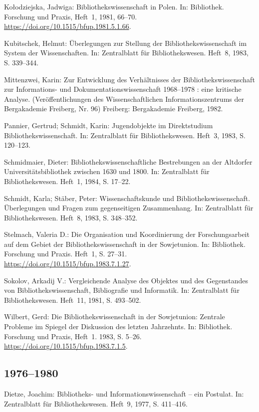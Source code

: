 \documentclass[a4paper,
fontsize=11pt,
oneside,
numbers=noperiodatend,
parskip=half-,
bibliography=totoc,
final
]{scrartcl}
\begin{document}
Kołodziejska, Jadwiga: Bibliothekswissenschaft in Polen. In: Bibliothek.
Forschung und Praxis, Heft~1, 1981, 66--70.
\url{https://doi.org/10.1515/bfup.1981.5.1.66}.

Kubitschek, Helmut: Überlegungen zur Stellung der
Bibliothekswissenschaft im System der Wissenschaften. In: Zentralblatt
für Bibliothekswesen. Heft~8, 1983, S. 339--344.

Mittenzwei, Karin: Zur Entwicklung des Verhältnisses der
Bibliothekswissenschaft zur Informa\-tions- und Dokumentationswissenschaft
1968--1978 : eine kritische Analyse. (Veröffentlichungen des
Wissenschaftlichen Informationszentrums der Bergakademie Freiberg, Nr.
96) Freiberg: Bergakademie Freiberg, 1982.

Pannier, Gertrud; Schmidt, Karin: Jugendobjekte im Direktstudium
Bibliothekswissenschaft. In: Zentralblatt für Bibliothekswesen. Heft~3,
1983, S. 120--123.

Schmidmaier, Dieter: Bibliothekswissenschaftliche Bestrebungen an der
Altdorfer Universitätsbibliothek zwischen 1630 und 1800. In:
Zentralblatt für Bibliothekswesen. Heft~1, 1984, S. 17--22.

Schmidt, Karla; Stäber, Peter: Wissenschaftskunde und
Bibliothekswissenschaft. Überlegungen und Fragen zum gegenseitigen
Zusammenhang. In: Zentralblatt für Bibliothekswesen. Heft~8, 1983, S. 348--352.

Stelmach, Valeria D.: Die Organisation und Koordinierung der
Forschungsarbeit auf dem Gebiet der Bibliothekswissenschaft in der
Sowjetunion. In: Bibliothek. Forschung und Praxis. Heft~1, S. 27--31.
\url{https://doi.org/10.1515/bfup.1983.7.1.27}.

Sokolov, Arkadij V.: Vergleichende Analyse des Objektes und des
Gegenstandes von Bibliothekswissenschaft, Bibliografie und Informatik.
In: Zentralblatt für Bibliothekswesen. Heft~11, 1981, S. 493--502.

Wilbert, Gerd: Die Bibliothekswissenschaft in der Sowjetunion: Zentrale
Probleme im Spiegel der Diskussion des letzten Jahrzehnts. In:
Bibliothek. Forschung und Praxis, Heft~1. 1983, S. 5--26.
\url{https://doi.org/10.1515/bfup.1983.7.1.5}.

\hypertarget{section-4}{%
\subsection*{1976--1980}\label{section-4}}

Dietze, Joachim: Bibliotheks- und Informationswissenschaft -- ein
Postulat. In: Zentralblatt für Bibliothekswesen. Heft~9, 1977, S. 411--416.
\end{document}
